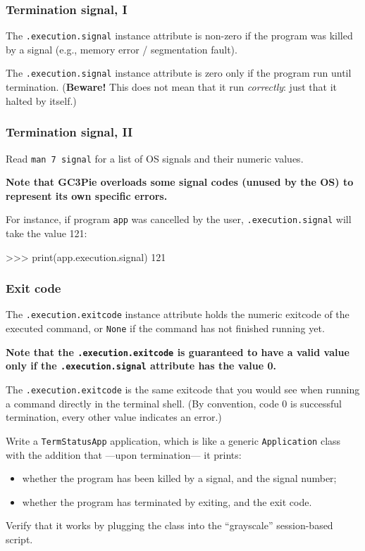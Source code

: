 \documentclass[english,serif,mathserif,xcolor=pdftex,dvipsnames,table]{beamer}
\begin{document}
\begin{frame}[fragile]
  \frametitle{Termination signal, I}

  The \texttt{.execution.signal} instance attribute is non-zero if
  the program was killed by a signal (e.g., memory error / segmentation fault).

  \+
  The \texttt{.execution.signal} instance attribute is zero only if
  the program run until termination. (\textbf{Beware!} This does not
  mean that it run \emph{correctly}: just that it halted by itself.)
\end{frame}


\begin{frame}[fragile]
  \frametitle{Termination signal, II}

  Read \texttt{man 7 signal} for a list of OS signals and their
  numeric values.

  \+
  {\bfseries Note that GC3Pie overloads some signal codes (unused
    by the OS) to represent its own specific errors.}

  \+
  For instance, if program \texttt{app} was cancelled by the user,
  \texttt{.execution.signal} will take the value 121:
\begin{python}
>>> print(app.execution.signal)
121
\end{python}
\end{frame}


\begin{frame}[fragile]
  \frametitle{Exit code}

  The \texttt{.execution.exitcode} instance attribute holds the
  numeric exitcode of the executed command, or \texttt{None} if the
  command has not finished running yet.

  \+
  {\bfseries Note that the \texttt{.execution.exitcode} is guaranteed
    to have a valid value only if the \texttt{.execution.signal}
    attribute has the value 0.}

  \+
  The \texttt{.execution.exitcode} is the same exitcode that you
  would see when running a command directly in the terminal shell. (By
  convention, code 0 is successful termination, every other value
  indicates an error.)
\end{frame}


\begin{frame}
  \begin{exercise*}[3.B]

    Write a \texttt{TermStatusApp} application, which is like a
    generic \texttt{Application} class with the addition that ---upon
    termination--- it prints:
    \begin{itemize}
    \item whether the program has been killed by a signal, and the signal number;
    \item whether the program has terminated by exiting, and the exit code.
    \end{itemize}

    Verify that it works by plugging the class into the ``grayscale''
    session-based script.
  \end{exercise*}
\end{frame}
\end{document}
